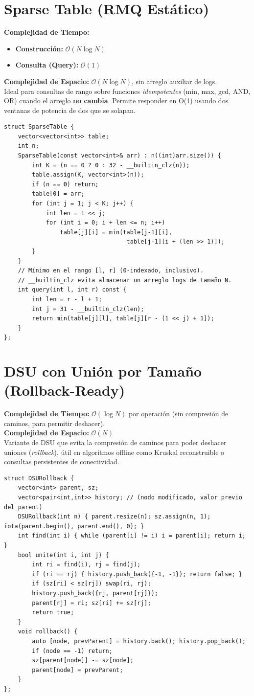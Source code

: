 \documentclass[10pt,twocolumn,letterpaper]{report}
\begin{document}
\section{Sparse Table (RMQ Estático)}
\textbf{Complejidad de Tiempo:}
\begin{itemize}
    \item \textbf{Construcción:} $\mathcal{O}(N \log N)$
    \item \textbf{Consulta (Query):} $\mathcal{O}(1)$
\end{itemize}
\textbf{Complejidad de Espacio:} $\mathcal{O}(N \log N)$, sin arreglo auxiliar de logs. \\
Ideal para consultas de rango sobre funciones \textit{idempotentes} (min, max, gcd, AND, OR) cuando el arreglo \textbf{no cambia}. Permite responder en O(1) usando dos ventanas de potencia de dos que se solapan.
\begin{lstlisting}
struct SparseTable {
    vector<vector<int>> table;
    int n;
    SparseTable(const vector<int>& arr) : n((int)arr.size()) {
        int K = (n == 0 ? 0 : 32 - __builtin_clz(n));
        table.assign(K, vector<int>(n));
        if (n == 0) return;
        table[0] = arr;
        for (int j = 1; j < K; j++) {
            int len = 1 << j;
            for (int i = 0; i + len <= n; i++)
                table[j][i] = min(table[j-1][i],
                                   table[j-1][i + (len >> 1)]);
        }
    }
    // Mínimo en el rango [l, r] (0-indexado, inclusivo).
    // __builtin_clz evita almacenar un arreglo logs de tamaño N.
    int query(int l, int r) const {
        int len = r - l + 1;
        int j = 31 - __builtin_clz(len);
        return min(table[j][l], table[j][r - (1 << j) + 1]);
    }
};
\end{lstlisting}
\section{DSU con Unión por Tamaño (Rollback-Ready)}
\textbf{Complejidad de Tiempo:} $\mathcal{O}(\log N)$ por operación (sin compresión de caminos, para permitir deshacer). \\
\textbf{Complejidad de Espacio:} $\mathcal{O}(N)$ \\
Variante de DSU que evita la compresión de caminos para poder deshacer uniones (\textit{rollback}), útil en algoritmos offline como Kruskal reconstruible o consultas persistentes de conectividad.
\begin{lstlisting}
struct DSURollback {
    vector<int> parent, sz;
    vector<pair<int,int>> history; // (nodo modificado, valor previo del parent)
    DSURollback(int n) { parent.resize(n); sz.assign(n, 1); iota(parent.begin(), parent.end(), 0); }
    int find(int i) { while (parent[i] != i) i = parent[i]; return i; }
    bool unite(int i, int j) {
        int ri = find(i), rj = find(j);
        if (ri == rj) { history.push_back({-1, -1}); return false; }
        if (sz[ri] < sz[rj]) swap(ri, rj);
        history.push_back({rj, parent[rj]});
        parent[rj] = ri; sz[ri] += sz[rj];
        return true;
    }
    void rollback() {
        auto [node, prevParent] = history.back(); history.pop_back();
        if (node == -1) return;
        sz[parent[node]] -= sz[node];
        parent[node] = prevParent;
    }
};
\end{lstlisting}
\end{document}
